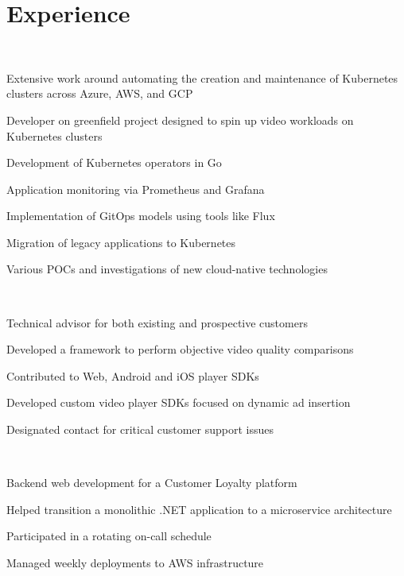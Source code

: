 \documentclass[]{hieudo-build}
\begin{document}
\hfill
\begin{minipage}[t]{0.69\textwidth} 

\section{Experience}

\\
\vspace{0.9em} %
\begin{tightemize}
\item Extensive work around automating the creation and maintenance of Kubernetes clusters across Azure, AWS, and GCP
\item Developer on greenfield project designed to spin up video workloads on Kubernetes clusters
\item Development of Kubernetes operators in Go
\item Application monitoring via Prometheus and Grafana
\item Implementation of GitOps models using tools like Flux
\item Migration of legacy applications to Kubernetes
\item Various POCs and investigations of new cloud-native technologies
\end{tightemize}

\sectionsep

\\
\begin{tightemize}
\item Technical advisor for both existing and prospective customers
\item Developed a framework to perform objective video quality comparisons
\item Contributed to Web, Android and iOS player SDKs
\item Developed custom video player SDKs focused on dynamic ad insertion
\item Designated contact for critical customer support issues
\end{tightemize}

\sectionsep

\\
\begin{tightemize}
\item Backend web development for a Customer Loyalty platform
\item Helped transition a monolithic .NET application to a microservice architecture
\item Participated in a rotating on-call schedule
\item Managed weekly deployments to AWS infrastructure
\end{tightemize}


\end{minipage}
\end{document}
